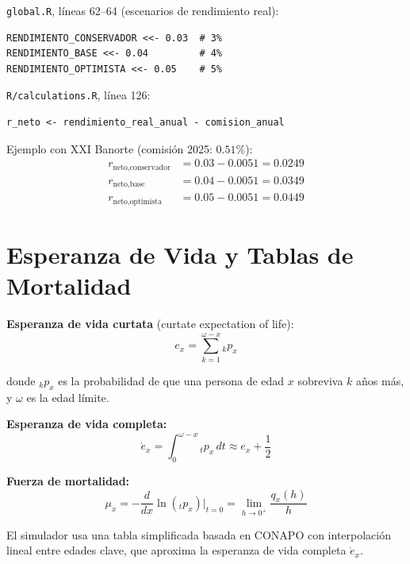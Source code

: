 \documentclass[11pt,a4paper]{report}
\theoremstyle{remark}
\begin{document}
\begin{tcolorbox}[colback=orange!5!white, colframe=orange!75!black, title=\textbf{Aplicaci\'on en C\'odigo}]
\texttt{global.R}, l\'ineas 62--64 (escenarios de rendimiento real):
\begin{lstlisting}
RENDIMIENTO_CONSERVADOR <<- 0.03  # 3%
RENDIMIENTO_BASE <<- 0.04         # 4%
RENDIMIENTO_OPTIMISTA <<- 0.05    # 5%
\end{lstlisting}

\texttt{R/calculations.R}, l\'inea 126:
\begin{lstlisting}
r_neto <- rendimiento_real_anual - comision_anual
\end{lstlisting}

Ejemplo con XXI Banorte (comisi\'on 2025: $0.51\%$):
\begin{align*}
r_{\text{neto,conservador}} &= 0.03 - 0.0051 = 0.0249 \\
r_{\text{neto,base}} &= 0.04 - 0.0051 = 0.0349 \\
r_{\text{neto,optimista}} &= 0.05 - 0.0051 = 0.0449
\end{align*}
\end{tcolorbox}

\section{Esperanza de Vida y Tablas de Mortalidad}

\begin{tcolorbox}[colback=blue!5!white, colframe=blue!75!black, title=\textbf{Definici\'on Formal}]
\textbf{Esperanza de vida curtata} (curtate expectation of life):
\begin{equation}
e_x = \sum_{k=1}^{\omega - x} {}_k p_x
\end{equation}

donde ${}_k p_x$ es la probabilidad de que una persona de edad $x$ sobreviva $k$ a\~nos m\'as, y $\omega$ es la edad l\'imite.

\textbf{Esperanza de vida completa:}
\begin{equation}
\mathring{e}_x = \int_0^{\omega - x} {}_t p_x \, dt \approx e_x + \frac{1}{2}
\end{equation}

\textbf{Fuerza de mortalidad:}
\begin{equation}
\mu_x = -\frac{d}{dx} \ln({}_t p_x)\Big|_{t=0} = \lim_{h \to 0^+} \frac{q_x(h)}{h}
\end{equation}

El simulador usa una tabla simplificada basada en CONAPO con interpolaci\'on lineal entre edades clave, que aproxima la esperanza de vida completa $\mathring{e}_x$.
\end{tcolorbox}
\end{document}
